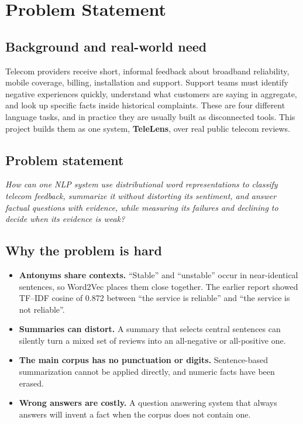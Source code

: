 \documentclass[11pt,a4paper]{article}
\begin{document}
\section{Problem Statement}
\subsection{Background and real-world need}
Telecom providers receive short, informal feedback about broadband reliability, mobile coverage, billing, installation and support. Support teams must identify negative experiences quickly, understand what customers are saying in aggregate, and look up specific facts inside historical complaints. These are four different language tasks, and in practice they are usually built as disconnected tools. This project builds them as one system, \textbf{TeleLens}, over real public telecom reviews.

\subsection{Problem statement}
\textit{How can one NLP system use distributional word representations to classify telecom feedback, summarize it without distorting its sentiment, and answer factual questions with evidence, while measuring its failures and declining to decide when its evidence is weak?}

\subsection{Why the problem is hard}
\begin{itemize}
\item \textbf{Antonyms share contexts.} ``Stable'' and ``unstable'' occur in near-identical sentences, so Word2Vec places them close together. The earlier report showed TF--IDF cosine of 0.872 between ``the service is reliable'' and ``the service is not reliable''.
\item \textbf{Summaries can distort.} A summary that selects central sentences can silently turn a mixed set of reviews into an all-negative or all-positive one.
\item \textbf{The main corpus has no punctuation or digits.} Sentence-based summarization cannot be applied directly, and numeric facts have been erased.
\item \textbf{Wrong answers are costly.} A question answering system that always answers will invent a fact when the corpus does not contain one.
\end{itemize}
\end{document}
